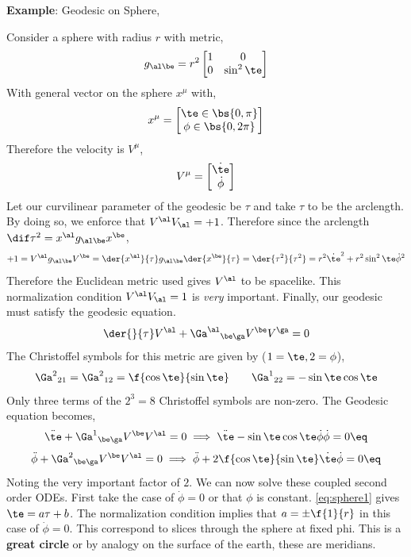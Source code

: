 \documentclass{article}
\newcommand{\mtrx}[1]{
    \begin{bmatrix}
    #1
    \end{bmatrix}
}
\begin{document}
\textbf{Example}: Geodesic on Sphere,
\begin{center}
\end{center}
Consider a sphere with radius $r$ with metric,
\[ g_{\al\be} = r^2 \mtrx{1 & 0 \\ 0 & \sin^2\te} \]
With general vector on the sphere $x^\mu$ with,
\[ x^\mu = \mtrx{\te \in \bs{0,\pi}\\ \phi\in \bs{0,2\pi}} \]
Therefore the velocity is $V^\mu$,
\[ V^\mu = \mtrx{\dot{\te} \\ \dot{\phi}}\]
Let our curvilinear parameter of the geodesic be $\tau$ and take $\tau$ to be the arclength. By doing so, we enforce that $V^\al V_\al = + 1$. Therefore since the arclength $\dif \tau^2 = x^\al g_{\al\be} x^\be$,
\[ +1 = V^\al g_{\al\be} V^\be = \der{x^\al}{\tau} g_{\al\be} \der{x^\be}{\tau} = \der{\tau^2}{\tau^2} = r^2\dot{\te}^2 + r^2\sin^2 \te \dot{\phi}^2 \]
Therefore the Euclidean metric used gives $V^\al$ to be spacelike.  This normalization condition $V^\al V_\al = 1$ is \textit{very} important. Finally, our geodesic must satisfy the geodesic equation.
\[ \der{}{\tau}V^\al + {\Ga^\al}_{\be\ga} V^\be V^\ga = 0 \]
The Christoffel symbols for this metric are given by ($1 = \te , 2 = \phi$),
\[ {\Ga^2}_{21} = {\Ga^2}_{12} = \f{\cos \te }{\sin \te} \qquad {\Ga^1}_{22} = - \sin \te \cos \te \]
Only three terms of the $2^3 = 8$ Christoffel symbols are non-zero. The Geodesic equation becomes,
\[ \ddot{\te} + {\Ga^{1}}_{\be\ga} V^\be V^\al = 0 \implies \ddot{\te} - \sin \te \cos \te \dot{\phi}\dot{\phi} = 0 \eq \label{eq:sphere1}\]
\[ \ddot{\phi} + {\Ga^{2}}_{\be\ga} V^\be V^\al = 0 \implies \ddot{\phi} + 2\f{\cos \te}{\sin \te}\dot{\te}\dot{\phi} = 0 \eq \label{eq:sphere2} \]
Noting the very important factor of $2$. We can now solve these coupled second order ODEs. First take the case of $\dot{\phi} = 0$ or that $\phi$ is constant. \eqref{eq:sphere1} gives $\te = a \tau + b$. The normalization condition implies that $a = \pm\f{1}{r}$ in this case of $\dot{\phi} = 0$. This correspond to slices through the sphere at fixed phi. This is a \textbf{great circle} or by analogy on the surface of the earth, these are meridians. \\
\end{document}
